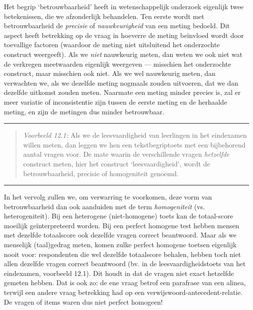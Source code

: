 \documentclass[
]{book}
\begin{document}
Het begrip `betrouwbaarheid' heeft in wetenschappelijk onderzoek
eigenlijk twee betekenissen, die we afzonderlijk behandelen. Ten eerste
wordt met betrouwbaarheid de \emph{precisie} of \emph{nauwkeurigheid} van een
meting bedoeld. Dit aspect heeft betrekking op de vraag in hoeverre de
meting beïnvloed wordt door toevallige factoren (waardoor de meting niet
uitsluitend het onderzochte construct weergeeft). Als we \emph{niet}
nauwkeurig meten, dan weten we ook niet wat de verkregen meetwaarden
eigenlijk weergeven --- misschien het onderzochte construct, maar
misschien ook niet. Als we wel nauwkeurig meten, dan verwachten we, als
we dezelfde meting nogmaals zouden uitvoeren, dat we dan dezelfde
uitkomst zouden meten. Naarmate een meting minder precies is, zal er
meer variatie of inconsistentie zijn tussen de eerste meting en de
herhaalde meting, en zijn de metingen dus minder betrouwbaar.

\begin{center}\rule{0.5\linewidth}{0.5pt}\end{center}

\begin{quote}
\emph{Voorbeeld 12.1:} Als we de leesvaardigheid van
leerlingen in het eindexamen willen meten, dan leggen we hen een
tekstbegriptoets met een bijbehorend aantal vragen voor. De mate waarin
de verschillende vragen \emph{hetzelfde} construct meten, hier het construct `leesvaardigheid',
wordt de betrouwbaarheid, precisie of homogeniteit genoemd.
\end{quote}

\begin{center}\rule{0.5\linewidth}{0.5pt}\end{center}

In het vervolg zullen we, om verwarring te voorkomen, deze vorm van
betrouwbaarheid dan ook aanduiden met de term \emph{homogeniteit} (vs.
heterogeniteit). Bij een heterogene (niet-homogene) toets kan de
totaal-score moeilijk geïnterpreteerd worden. Bij een perfect homogene
test hebben mensen met dezelfde totaalscore ook dezelfde vragen correct
beantwoord. Maar als we menselijk (taal)gedrag meten, komen zulke
perfect homogene toetsen eigenlijk nooit voor: respondenten die wel
dezelfde totaalscore behalen, hebben toch niet allen dezelfde vragen
correct beantwoord (bv. in de leesvaardigheidstoets van het eindexamen,
voorbeeld 12.1). Dit houdt in dat de
vragen niet exact hetzelfde gemeten hebben. Dat is ook zo: de ene vraag
betrof een parafrase van een alinea, terwijl een andere vraag betrekking
had op een verwijswoord-antecedent-relatie. De vragen of items waren dus
niet perfect homogeen!
\end{document}
